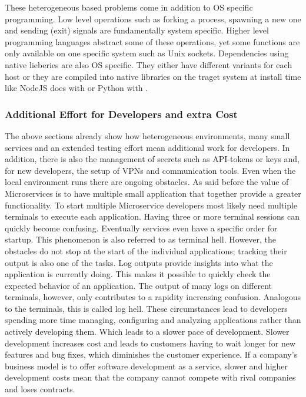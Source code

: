 \documentclass[12pt, a4paper]{article}
\begin{document}
        These heterogeneous based problems come in addition to \acl{OS} specific programming. Low level operations such as forking a process, spawning a new one and sending (exit) signals are fundamentally system specific. Higher level programming languages abstract some of these operations, yet some functions are only available on one specific system such as Unix sockets. Dependencies using native lieberies are also \ac{OS} specific. They either have different variants for each host or they are compiled into native libraries on the traget system at install time like NodeJS does with  or Python with .

        \subsubsection{Additional Effort for Developers and extra Cost}
        The above sections already show how heterogeneous environments, many small services and an extended testing effort mean additional work for developers. In addition, there is also the management of secrets such as API-tokens or keys and, for new developers, the setup of \ac{VPN}s and communication tools. Even when the local environment runs there are ongoing obstacles. As said before the value of Microservices is to have multiple small application that together provide a greater functionality. To start multiple Microservice developers most likely need multiple terminals to execute each application. Having three or more terminal sessions can quickly become confusing. Eventually services even have a specific order for startup. This phenomenon is also referred to as terminal hell. However, the obstacles do not stop at the start of the individual applications; tracking their output is also one of the tasks. Log outputs provide insights into what the application is currently doing. This makes it possible to quickly check the expected behavior of an application. The output of many logs on different terminals, however, only contributes to a rapidity increasing confusion. Analogous to the terminals, this is called log hell.\newline
        These circumstances lead to developers spending more time managing, configuring and analyzing applications rather than actively developing them. Which leads to a slower pace of development. Slower development increases cost and leads to customers having to wait longer for new features and bug fixes, which diminishes the customer experience. If a company's business model is to offer software development as a service, slower and higher development costs mean that the company cannot compete with rival companies and loses contracts.
\end{document}
